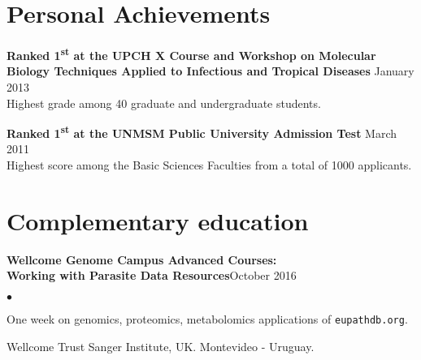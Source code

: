 \documentclass[margin,line]{res}
\newenvironment{list2}{
  \begin{list}{$\bullet$}{%
      \setlength{\itemsep}{0in}
      \setlength{\parsep}{0in} \setlength{\parskip}{0in}
      \setlength{\topsep}{0in} \setlength{\partopsep}{0in}
      \setlength{\leftmargin}{0.2in}}}{\end{list}}
\begin{document}
\begin{resume}
\newpage

\section{\sc Personal Achievements}

{\bf Ranked 1\textsuperscript{st} at the UPCH X Course and Workshop on Molecular\\Biology Techniques Applied to Infectious and Tropical Diseases} \hfill January 2013\\
Highest grade among 40 graduate and undergraduate students. %

{\bf Ranked 1\textsuperscript{st} at the UNMSM Public University Admission Test} \hfill March 2011\\
Highest score among the Basic Sciences Faculties from a total of 1000 applicants.\\%

\section{\sc Complementary education}

{\bf Wellcome Genome Campus Advanced Courses:\\Working with Parasite Data Resources}\hfill {October 2016}\\
	\vspace*{-.1in}%
\begin{list2} %
	\item One week on genomics, proteomics, metabolomics applications of \texttt{eupathdb.org}.
	\item Wellcome Trust Sanger Institute, UK. Montevideo - Uruguay.%
\end{list2}


\end{resume}
\end{document}
